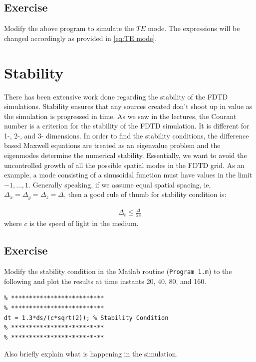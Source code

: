 \documentclass[11pt]{article}
\begin{document}
\subsection*{Exercise}

\begin{mdframed}[backgroundcolor=blue!20]
  Modify the above program to simulate the $TE$ mode. The expressions will be changed accordingly as provided in \eqref{eq:TE mode}.
\end{mdframed}


\section{Stability}

There has been extensive work done regarding the stability of the FDTD simulations. Stability ensures that any sources created don't shoot up in value as the simulation is progressed in time. As we saw in the lectures, the Courant number is a criterion for the stability of the FDTD simulation. It is different for 1-, 2-, and 3- dimensions. In order to find the stability conditions, the difference based Maxwell equations are treated as an eigenvalue problem and the eigenmodes determine the numerical stability. Essentially, we want to avoid the uncontrolled growth of all the possible spatial modes in the FDTD grid. As an example, a mode consisting of a sinusoidal function must have values in the limit $-1, \dots, 1$. Generally speaking, if we assume equal spatial spacing, ie, $\Delta_x = \Delta_y = \Delta_z = \Delta$, then a good rule of thumb for stability condition is:

\begin{align}
  \Delta_t \le \frac{\Delta}{2c}
\end{align}
where $c$ is the speed of light in the medium.

\subsection*{Exercise}

\begin{mdframed}[backgroundcolor=blue!20]

  Modify the stability condition in the Matlab routine (\texttt{Program 1.m}) to the following and plot the results at time instants 20, 40, 80, and 160.
  \scriptsize
  \begin{verbatim}
% **************************
% **************************
dt = 1.3*ds/(c*sqrt(2)); % Stability Condition
% **************************
% **************************
  \end{verbatim}
\end{mdframed}
Also briefly explain what is happening in the simulation.
\end{document}
